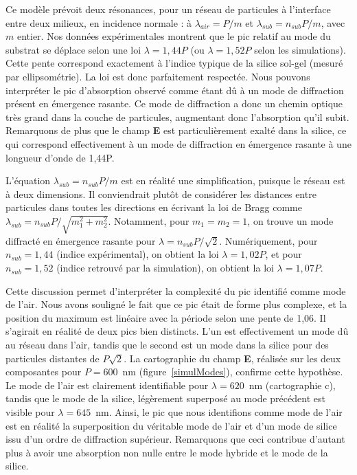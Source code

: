 Ce modèle prévoit deux résonances, pour un réseau de particules à l'interface entre deux milieux, en incidence normale : à $\lambda_{air} = P/m$ et $\lambda_{sub} = n_{sub}P/m$, avec $m$ entier. Nos données expérimentales montrent que le pic relatif au mode du substrat se déplace selon une loi $\lambda = 1,44P $ (ou $\lambda = 1, 52P$ selon les simulations). Cette pente correspond exactement à l'indice typique de la silice sol-gel (mesuré par ellipsométrie). La loi est donc parfaitement respectée. Nous pouvons interpréter le pic d'absorption observé comme étant dû à un mode de diffraction présent en émergence rasante. Ce mode de diffraction a donc un chemin optique très grand dans la couche de particules, augmentant donc l'absorption qu'il subit. Remarquons de plus que le champ \textbf{E} est particulièrement exalté dans la silice, ce qui correspond effectivement à un mode de diffraction en émergence rasante à une longueur d'onde de 1,44P.\par 
L'équation $\lambda_{sub} = n_{sub}P/m$ est en réalité une simplification, puisque le réseau est à deux dimensions. Il conviendrait plutôt de considérer les distances entre particules dans toutes les directions en écrivant la loi de Bragg comme $\lambda_{sub} = n_{sub}P/\sqrt{m_1^2+m_2^2}$. Notamment, pour $m_1=m_2=1$, on trouve un mode diffracté en émergence rasante pour $\lambda = n_{sub}P/\sqrt{2}$. Numériquement, pour $n_{sub}=1,44$ (indice expérimental), on obtient la loi $\lambda = 1,02 P$, et pour $n_{sub}=1,52$ (indice retrouvé par la simulation), on obtient la loi $\lambda = 1,07 P$.\par 
Cette discussion permet d'interpréter la complexité du pic identifié comme mode de l'air. Nous avons souligné le fait que ce pic était de forme plus complexe, et la position du maximum est linéaire avec la période selon une pente de 1,06. Il s'agirait en réalité de deux pics bien distincts. L'un est effectivement un mode dû au réseau dans l'air, tandis que le second est un mode dans la silice pour des particules distantes de $P\sqrt{2}$. La cartographie du champ \textbf{E}, réalisée sur les deux composantes pour $P = 600$~nm (figure~\ref{simulModes}), confirme cette hypothèse. Le mode de l'air est clairement identifiable pour $\lambda = 620$~nm (cartographie c), tandis que le mode de la silice, légèrement superposé au mode précédent est visible pour $\lambda = 645$~nm. Ainsi, le pic que nous identifions comme \og mode de l'air \fg{} est en réalité la superposition du véritable mode de l'air et d'un mode de silice issu d'un ordre de diffraction supérieur. Remarquons que ceci contribue d'autant plus à avoir une absorption non nulle entre le mode hybride et le mode de la silice.\par 

